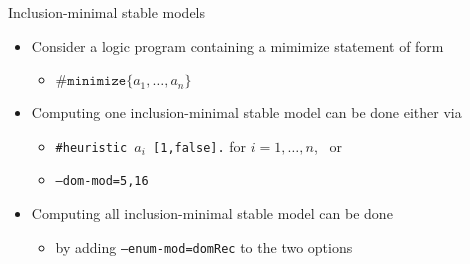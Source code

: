 \begin{frame}{Inclusion-minimal stable models}
  \bigskip
  \begin{itemize}
  \item<1-> Consider a logic program containing a mimimize statement of form
    \begin{itemize}\normalsize
    \item \( \#\mathtt{minimize}\{ a_1,\dots,a_n\} \)
    \end{itemize}
    \medskip
  \item<2-> Computing one inclusion-minimal stable model can be done either via
    \begin{itemize}\normalsize
    \item \texttt{\#heuristic $a_i$ [1,false].} \qquad for $i=1,\dots,n$, \ or
    \item \texttt{--dom-mod=5,16}
    \end{itemize}
    \medskip
  \item<3-> Computing all inclusion-minimal stable model can be done
    \begin{itemize}\normalsize
    \item by adding \texttt{--enum-mod=domRec} to the two options
    \end{itemize}
  \end{itemize}
\end{frame}
%
